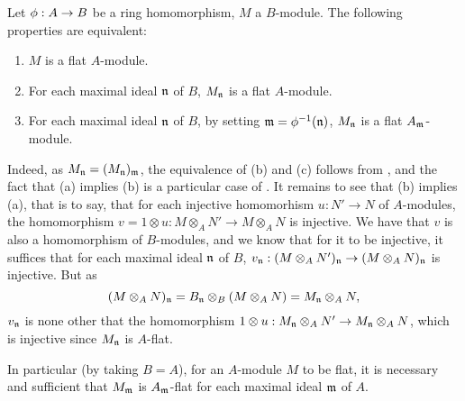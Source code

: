 \begin{env}[6.3.3]
\label{0.6.3.3}
Let $\vphi:A\to B$ be a ring homomorphism, $M$ a $B$-module. The following
properties are equivalent:
\begin{enumerate}[label=(\alph*)]
  \item $M$ is a flat $A$-module.
  \item For each maximal ideal $\mathfrak{n}$ of $B$, $M_\mathfrak{n}$ is a flat $A$-module.
  \item For each maximal ideal $\mathfrak{n}$ of $B$, by setting
    $\mathfrak{m}=\phi^{-1}(\mathfrak{n})$, $M_\mathfrak{n}$ is a flat $A_\mathfrak{m}$-module.
\end{enumerate}

Indeed, as $M_\mathfrak{n}=(M_\mathfrak{n})_\mathfrak{m}$, the equivalence of
(b) and (c) follows from , and the fact that (a) implies (b) is
a particular case of . It remains to see that (b) implies (a),
that is to say, that for each injective homomorhism $u:N'\to N$ of $A$-modules, the
homomorphism $v=1\otimes u:M\otimes_A N'\to M\otimes_A N$ is injective. We have that $v$ is
also a homomorphism of $B$-modules, and we know that for it to be injective, it suffices that
for each maximal ideal $\mathfrak{n}$ of $B$,
$v_\fk{n}:(M\otimes_A N')_\fk{n}\to(M\otimes_A N)_\fk{n}$ is injective. But
as
\[
  (M\otimes_A N)_\mathfrak{n}=B_\mathfrak{n}\otimes_B(M\otimes_A N)
  =M_\mathfrak{n}\otimes_A N,
\]
$v_\mathfrak{n}$ is none other that the homomorphism
$1\otimes u:M_\fk{n}\otimes_A N'\to M_\fk{n}\otimes_A N$, which is injective
since $M_\mathfrak{n}$ is $A$-flat.

In particular (by taking $B=A$), for an $A$-module $M$ to be flat, it is necessary and
sufficient that $M_\mathfrak{m}$ is $A_\mathfrak{m}$-flat for each maximal ideal
$\mathfrak{m}$ of $A$.
\end{env}

